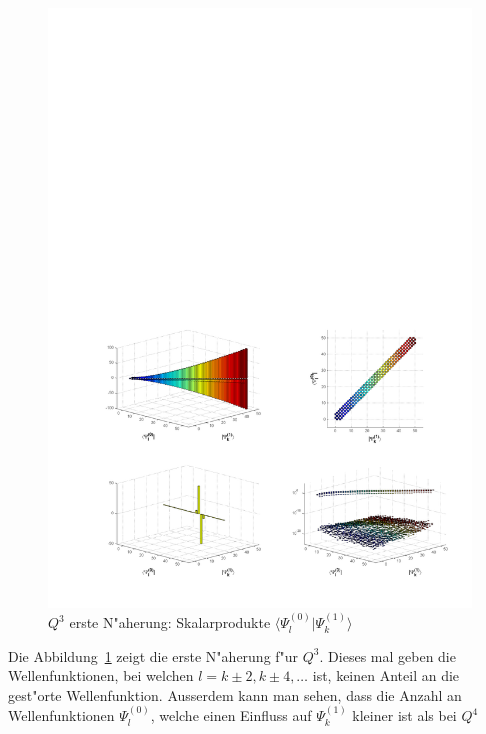 \begin{refsection}
\begin{figure}	%
\centering
\includegraphics[width=1.0\textwidth]{anharmonisch/images/x3/Stoerung1Skalare.pdf}
\caption{$Q^3$ erste N"aherung: Skalarprodukte $\langle\Psi_l^{(0)}|\Psi_k^{(1)}\rangle$  
\label{skript:x3_Stoerung1Skalare}}
\end{figure}

Die Abbildung~\ref{skript:x3_Stoerung1Skalare} zeigt die erste N"aherung f"ur $Q^3$.
Dieses mal geben die Wellenfunktionen, bei welchen $l=k\pm 2,k\pm 4,\dots$ ist,
keinen Anteil an die gest"orte Wellenfunktion.
Ausserdem kann man sehen, dass die Anzahl an Wellenfunktionen $\Psi_l^{(0)}$,
welche einen Einfluss auf $\Psi_k^{(1)}$ kleiner ist als bei $Q^4$


\end{refsection}
